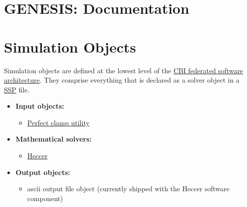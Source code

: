 \documentclass[12pt]{article}
\begin{document}
\section*{GENESIS: Documentation}

\section*{Simulation Objects}

Simulation objects are defined at the lowest level of the \href{../genesis-overview/genesis-overview.tex}{CBI federated software architecture}. They comprise everything that is declared as a solver object in a \href{../ssp/ssp.tex}{SSP} file.

\begin{itemize}

\item {\bf Input objects:}
   \begin{itemize}
      \item \href{../pclamp/pclamp.tex}{Perfect clamp utility}
   \end{itemize}
   
\item{\bf Mathematical solvers:}
   \begin{itemize}
      \item \href{../heccer/heccer.tex}{Heccer}
   \end{itemize}
   
\item {\bf Output objects:}
   \begin{itemize}
      \item ascii output file object (currently shipped with the Heccer software component)
   \end{itemize}

\end{itemize}
\end{document}
